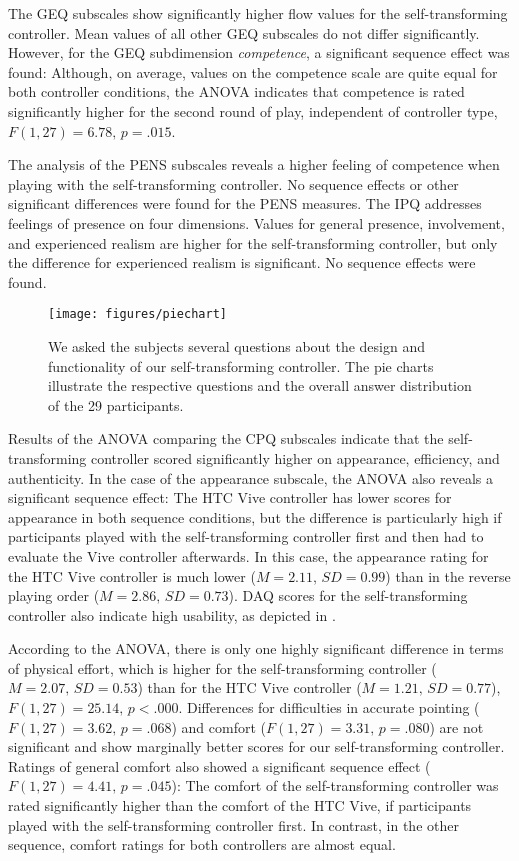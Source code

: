 \documentclass{sigchi}
\begin{document}
The GEQ subscales show significantly higher flow values for the self-transforming controller. Mean values of all other GEQ subscales do not differ significantly. However, for the GEQ subdimension \textit{competence}, a significant sequence effect was found: Although, on average, values on the competence scale are quite equal for both controller conditions, the ANOVA indicates that competence is rated significantly higher for the second round of play, independent of controller type, $F(1, 27) = 6.78,\,p = .015$.


The analysis of the PENS subscales reveals a higher feeling of competence when playing with the self-transforming controller. No sequence effects or other significant differences were found for the PENS measures. The IPQ addresses feelings of presence on four dimensions. Values for general presence, involvement, and experienced realism are higher for the self-transforming controller, but only the difference for experienced realism is significant. No sequence effects were found.

\begin{figure*}[t!]
\centering
\texttt{[image: figures/piechart]}
\caption{We asked the subjects several questions about the design and functionality of our self-transforming controller. The pie charts illustrate the respective questions and the overall answer distribution of the 29 participants.
}
\label{fig:piechart}
\end{figure*}

Results of the ANOVA comparing the CPQ subscales indicate that the self-transforming controller scored significantly higher on appearance, efficiency, and authenticity. In the case of the appearance subscale, the ANOVA also reveals a significant sequence effect: The HTC Vive controller has lower scores for appearance in both sequence conditions, but the difference is particularly high if participants played with the self-transforming controller first and then had to evaluate the Vive controller afterwards. In this case, the appearance rating for the HTC Vive controller is much lower ($M = 2.11,\,SD = 0.99$) than in the reverse playing order ($M = 2.86,\,SD = 0.73$). DAQ scores for the self-transforming controller also indicate high usability, as depicted in . 

According to the ANOVA, there is only one highly significant difference in terms of physical effort, which is higher for the self-transforming controller ($M = 2.07,\,SD = 0.53$) than for the HTC Vive controller ($M = 1.21,\,SD = 0.77$), $F(1, 27) = 25.14,\,p < .000$. Differences for difficulties in accurate pointing ($F(1, 27) = 3.62,\,p = .068$) and comfort ($F(1, 27) = 3.31,\,p = .080$) are not significant and show marginally better scores for our self-transforming controller. Ratings of general comfort also showed a significant sequence effect ($F(1, 27) = 4.41,\,p = .045$): The comfort of the self-transforming controller was rated significantly higher than the comfort of the HTC Vive, if participants played with the self-transforming controller first. In contrast, in the other sequence, comfort ratings for both controllers are almost equal.
\end{document}
